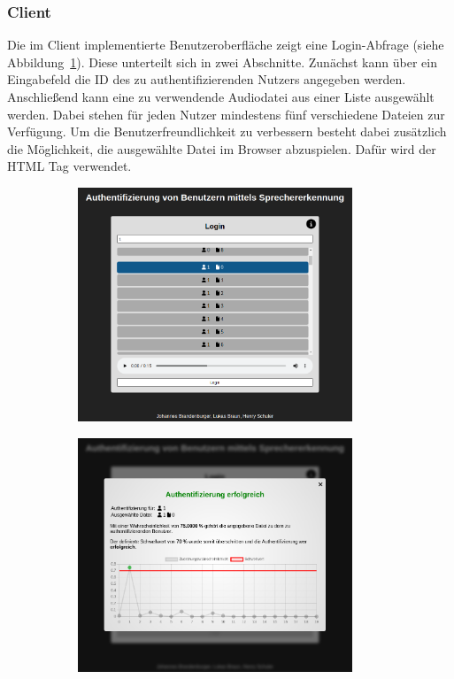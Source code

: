 \subsubsection{Client}
Die im Client implementierte Benutzeroberfläche zeigt eine Login-Abfrage (siehe Abbildung~\ref{fig:AppLogin}).
Diese unterteilt sich in zwei Abschnitte.
Zunächst kann über ein Eingabefeld die ID des zu authentifizierenden Nutzers angegeben werden.
Anschließend kann eine zu verwendende Audiodatei aus einer Liste ausgewählt werden.
Dabei stehen für jeden Nutzer mindestens fünf verschiedene Dateien zur Verfügung.
Um die Benutzerfreundlichkeit zu verbessern besteht dabei zusätzlich die Möglichkeit, die ausgewählte Datei im Browser abzuspielen.
Dafür wird der HTML  Tag verwendet.
\begin{figure}[H]
    \begin{subfigure}[c]{0.49\textwidth}
        \centering
        \includegraphics[width=0.9\textwidth, keepaspectratio]{images/UI.png}
        \label{fig:AppLogin}
    \end{subfigure}
    \begin{subfigure}[c]{0.49\textwidth}
        \centering
        \includegraphics[width=0.9\textwidth, keepaspectratio]{images/UIResult.png}

\end{subfigure}
\end{figure}
